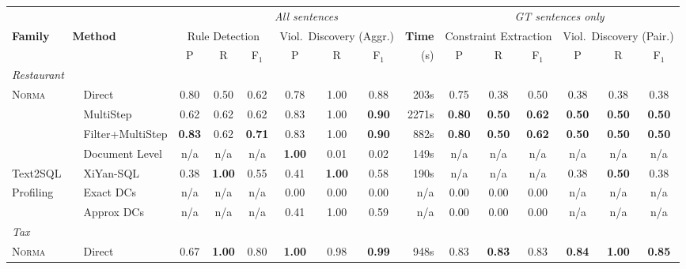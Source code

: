 \begin{table}[t]
  \centering
  \small
  \setlength{\tabcolsep}{4pt}
  \begin{tabular}{llcccccc@{\hspace{0.8em}}r@{\hspace{1.2em}}cccccc}
    \toprule
    & & \multicolumn{7}{c}{\textit{All sentences}} & \multicolumn{6}{c}{\textit{GT sentences only}} \\
    \cmidrule(lr){3-9}\cmidrule(lr){10-15}
    \textbf{Family} & \textbf{Method} & \multicolumn{3}{c}{Rule Detection} & \multicolumn{3}{c}{Viol.\ Discovery (Aggr.)} & \textbf{Time} & \multicolumn{3}{c}{Constraint Extraction} & \multicolumn{3}{c}{Viol.\ Discovery (Pair.)} \\
    \cmidrule(lr){3-5}  \cmidrule(lr){6-8}  \cmidrule(lr){10-12}  \cmidrule(lr){13-15}
    & & P & R & F$_1$ & P & R & F$_1$ & (s) & P & R & F$_1$ & P & R & F$_1$ \\
    \midrule
    \multicolumn{15}{l}{\textit{Restaurant}} \\
    \multirow{4}{*}{\textsc{Norma}} & ~~Direct & 0.80 & 0.50 & 0.62 & 0.78 & 1.00 & 0.88 & 203s & 0.75 & 0.38 & 0.50 & 0.38 & 0.38 & 0.38 \\
     & ~~MultiStep & 0.62 & 0.62 & 0.62 & 0.83 & 1.00 & \textbf{0.90} & 2271s & \textbf{0.80} & \textbf{0.50} & \textbf{0.62} & \textbf{0.50} & \textbf{0.50} & \textbf{0.50} \\
     & ~~Filter+MultiStep & \textbf{0.83} & 0.62 & \textbf{0.71} & 0.83 & 1.00 & \textbf{0.90} & 882s & \textbf{0.80} & \textbf{0.50} & \textbf{0.62} & \textbf{0.50} & \textbf{0.50} & \textbf{0.50} \\
     & ~~Document Level & n/a & n/a & n/a & \textbf{1.00} & 0.01 & 0.02 & 149s & n/a & n/a & n/a & n/a & n/a & n/a \\
    \cmidrule(l){2-15}
    \multirow{1}{*}{Text2SQL} & ~~XiYan-SQL & 0.38 & \textbf{1.00} & 0.55 & 0.41 & \textbf{1.00} & 0.58 & 190s & n/a & n/a & n/a & 0.38 & \textbf{0.50} & 0.38 \\
    \cmidrule(l){2-15}
    \multirow{2}{*}{Profiling} & ~~Exact DCs & n/a & n/a & n/a & 0.00 & 0.00 & 0.00 & n/a & 0.00 & 0.00 & 0.00 & n/a & n/a & n/a \\
     & ~~Approx DCs & n/a & n/a & n/a & 0.41 & 1.00 & 0.59 & n/a & 0.00 & 0.00 & 0.00 & n/a & n/a & n/a \\
    \midrule
    \multicolumn{15}{l}{\textit{Tax}} \\
    \multirow{4}{*}{\textsc{Norma}} & ~~Direct & 0.67 & \textbf{1.00} & 0.80 & \textbf{1.00} & 0.98 & \textbf{0.99} & 948s & 0.83 & \textbf{0.83} & 0.83 & \textbf{0.84} & \textbf{1.00} & \textbf{0.85} \\

\end{tabular}
\end{table}
